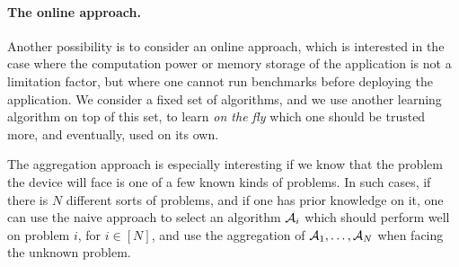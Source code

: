 \paragraph{The online approach.}
%
Another possibility is to consider an online approach, which is interested in the case where the computation power or memory storage of the application is not a limitation factor, but where one cannot run benchmarks before deploying the application.
We consider a fixed set of algorithms, and we use another learning algorithm on top of this set, to learn \emph{on the fly} which one should be trusted more, and eventually, used on its own.

The aggregation approach is especially interesting if we know that the problem the device will face is one of a few known kinds of problems.
In such cases, if there is $N$ different sorts of problems, and if one has prior knowledge on it, one can use the naive approach to select an algorithm $\mathcal{A}_i$ which should perform well on problem $i$, for $i\in[N]$,
and use the aggregation of $\mathcal{A}_1,\dots,\mathcal{A}_N$ when facing the unknown problem.





